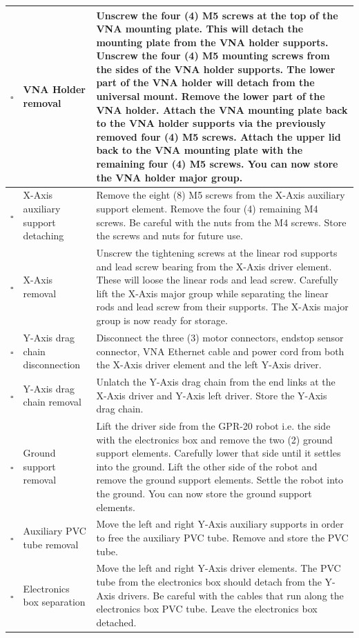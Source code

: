 \documentclass{article}
\begin{document}
\begin{onehalfspacing}
\begin{xltabular}{\textwidth}{|c|p{4cm}|X|}
    $\square$ & VNA Holder removal & Unscrew the four (4) M5 screws at the top of the VNA mounting plate. This will detach the mounting plate from the VNA holder supports. Unscrew the four (4) M5 mounting screws from the sides of the VNA holder supports. The lower part of the VNA holder will detach from the universal mount. Remove the lower part of the VNA holder. Attach the VNA mounting plate back to the VNA holder supports via the previously removed four (4) M5 screws. Attach the upper lid back to the VNA mounting plate with the remaining four (4) M5 screws. You can now store the VNA holder major group. \\ \hline
    $\square$ & X-Axis auxiliary support detaching & Remove the eight (8) M5 screws from the X-Axis auxiliary support element. Remove the four (4) remaining M4 screws. Be careful with the nuts from the M4 screws. Store the screws and nuts for future use. \\ \hline
    $\square$ & X-Axis removal & Unscrew the tightening screws at the linear rod supports and lead screw bearing from the X-Axis driver element. These will loose the linear rods and lead screw. Carefully lift the X-Axis major group while separating the linear rods and lead screw from their supports. The X-Axis major group is now ready for storage. \\ \hline
    $\square$ & Y-Axis drag chain disconnection & Disconnect the three (3) motor connectors, endstop sensor connector, VNA Ethernet cable and power cord from both the X-Axis driver element and the left Y-Axis driver.  \\ \hline
    $\square$ & Y-Axis drag chain removal & Unlatch the Y-Axis drag chain from the end links at the X-Axis driver and Y-Axis left driver. Store the Y-Axis drag chain. \\ \hline
    $\square$ & Ground support removal & Lift the driver side from the GPR-20 robot i.e. the side with the electronics box and remove the two (2) ground support elements. Carefully lower that side until it settles into the ground. Lift the other side of the robot and remove the ground support elements. Settle the robot into the ground. You can now store the ground support elements. \\ \hline
    $\square$ & Auxiliary PVC tube removal & Move the left and right Y-Axis auxiliary supports in order to free the auxiliary PVC tube. Remove and store the PVC tube. \\ \hline
    $\square$ & Electronics box separation & Move the left and right Y-Axis driver elements. The PVC tube from the electronics box should detach from the Y-Axis drivers. Be careful with the cables that run along the electronics box PVC tube. Leave the electronics box detached. \\ \hline

\end{xltabular}
\end{onehalfspacing}
\end{document}
